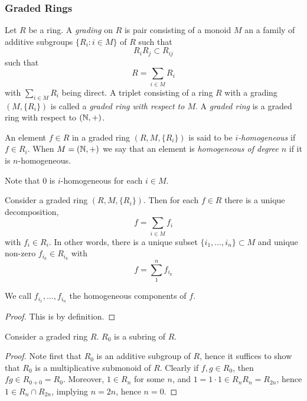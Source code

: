 \subsubsection{Graded Rings}
    \begin{definition}
        Let $R$ be a ring. A \emph{grading} on $R$ is pair consisting of a monoid $M$ an a family of additive subgroups $\{R_i : i\in M\}$ of $R$ such that 
        $$
            R_iR_j \subset R_{ij}
        $$
        such that 
        $$
            R = \sum_{i\in M}R_i
        $$
        with $\sum_{i\in M} R_i$ being direct. A triplet consisting of a ring $R$ with a grading $(M,\{R_i\})$ is called a \emph{graded ring with respect to $M$}. A \emph{graded ring} is a graded ring with respect to $(\mathbb{N},+)$.  
    \end{definition}
    \begin{definition}
        An element $f\in R$ in a graded ring $(R,M,\{R_i\})$ is said to be \emph{$i$-homogeneous} if $f\in R_i$. When $M=(\mathbb{N},+)$ we say that an element is \emph{homogeneous of degree $n$} if it is $n$-homogeneous. 
    \end{definition}
    \begin{remark}
        Note that $0$ is $i$-homogeneous for each $i\in M$.
    \end{remark}
    \begin{lemma}
        Consider a graded ring $(R,M,\{R_i\})$. Then for each $f\in R$ there is a unique decomposition, 
        $$
            f = \sum_{i\in M} f_i
        $$
        with $f_i\in R_i$. In other words, there is a unique subset $\{i_1,\dots,i_n\}\subset M$ and unique non-zero $f_{i_k}\in R_{i_k}$ with 
        $$
            f = \sum_1^n f_{i_k}
        $$
    \end{lemma}
    \begin{remark}
        We call $f_{i_1},\dots,f_{i_n}$ the homogeneous components of $f$. 
    \end{remark}
    \begin{proof}
        This is by definition. 
    \end{proof}
    \begin{lemma}
        Consider a graded ring $R$. $R_0$ is a subring of $R$.
    \end{lemma}
    \begin{proof}
        Note first that $R_0$ is an additive subgroup of $R$, hence it suffices to show that $R_0$ is a multiplicative submonoid of $R$. Clearly if $f,g\in R_0$, then $fg\in R_{0+0}=R_0$. Moreover, $1\in R_n$ for some $n$, and $1=1\cdot 1\in R_{n}R_{n}=R_{2n}$, hence $1\in R_{n}\cap R_{2n}$, implying $n=2n$, hence $n=0$.
    \end{proof}
